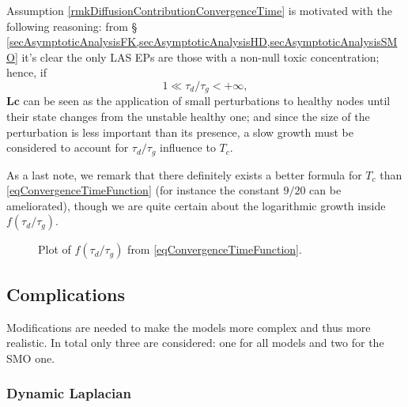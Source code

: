 \documentclass{article}
\begin{document}

                Assumption \ref{rmkDiffusionContributionConvergenceTime} is motivated with the following reasoning: from § \cref{secAsymptoticAnalysisFK,secAsymptoticAnalysisHD,secAsymptoticAnalysisSMO} it's clear the only LAS EPs are those with a non-null toxic concentration; hence, if \[1\ll\tau_d/\tau_g<+\infty,\]$\mathbf L\mathbf c$ can be seen as the application of small perturbations to healthy nodes until their state changes from the unstable healthy one\footnotemark{}; and since the size of the perturbation is less important than its presence, a slow growth must be considered to account for $\tau_d/\tau_g$ influence to $T_c$.


                As a last note, we remark that there definitely exists a better formula for $T_c$ than \eqref{eqConvergenceTimeFunction} (for instance the constant $9/20$ can be ameliorated), though we are quite certain about the logarithmic growth inside $f(\tau_d/\tau_g)$.

                \begin{figure}[tb]
                    \centering
                    \resizebox{\linewidth}{!}{}
                    \captionsetup{width=\linewidth}
                    \caption{Plot of $f(\tau_d/\tau_g)$ from \eqref{eqConvergenceTimeFunction}.}
                    \label{figftaudForm}
                \end{figure}

        \subsection{Complications}\label{secComplications}

            Modifications are needed to make the models more complex and thus more realistic. In total only three are considered: one for all models and two for the SMO one.

            \subsubsection{Dynamic Laplacian}\label{secComplicationsDynamicLaplacian}
\end{document}
